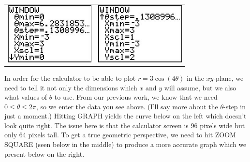 \begin{center}

\begin{tabular}{cc}

\includegraphics[width=1.8in]{./AppExtGraphics/Polar04.jpg} &
\hspace{0.75in} \includegraphics[width=1.8in]{./AppExtGraphics/Polar05.jpg}\\

\end{tabular} 

\end{center}

In order for the calculator to be able to plot $r = 3\cos(4\theta)$ in the $xy$-plane, we need to tell it not only the dimensions which $x$ and $y$ will assume, but we also what values of $\theta$ to use.  From our previous work, we know that we need $0 \leq \theta \leq 2\pi$, so we enter the data you see above.  (I'll say more about the $\theta$-step in just a moment.)  Hitting GRAPH yields the curve below on the left which doesn't look quite right.  The issue here is that the calculator screen is 96 pixels wide but only 64 pixels tall.  To get a true geometric perspective, we need to hit ZOOM SQUARE (seen below in the middle) to produce a more accurate graph which we present below on the right.  


